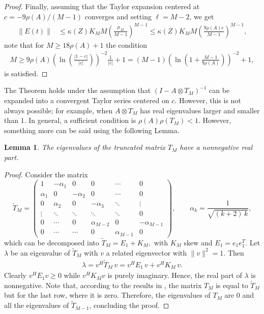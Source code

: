 \documentclass[final,1p,times,number]{elsarticle}
\theoremstyle{plain}%
\newtheorem{lem}[thm]{Lemma}
\begin{document}
\begin{proof}
    Finally, assuming that the Taylor expansion centered at \(c = -9\rho(A)/(M-1)\) converges and setting \(\ell = M-2\), we get
    \begin{align*}
        \| E(t) \| &\leq \kappa(Z)K_M M \left(\frac{\mu_{M}}{M-1} \right)^{M-1} \leq \kappa(Z)K_M M\left(\frac{9 \rho(A) e}{M-1} \right)^{M-1} , 
    \end{align*}
    note that for \(M \geq 18 \rho(A)+1\) the condition
    \begin{align*}
         M  \geq 
         9\rho(A) \left(\ln\left(\frac{|1-c|}{|c|}\right)\right)^{-2}\frac{1}{|c|} +1 = (M-1)\left(\ln\left(1 + \frac{M-1}{9 \rho(A)}\right)\right)^{-2}+1,
    \end{align*}
    is satisfied.
\end{proof}

The Theorem holds under the 
assumption that \((I-A\otimes T_{M})^{-1}\) can be expanded into a convergent Taylor series centered on $c$. However, this is not always possible; for example, when \(A\otimes T_{M}\) has real eigenvalues larger and smaller than $1$. In general, a sufficient condition is \(\rho(A)\rho(T_M) <1\). However, something more can be said using the following Lemma.  

\begin{lem}
    The eigenvalues of the truncated matrix $T_M$ have a nonnegative real part.
\end{lem}
\begin{proof}
  Consider the matrix
    \[ \tilde{T}_M = \begin{pmatrix}
1 & -\alpha_1 & 0 & 0 & \cdots & 0 \\
\alpha_1 & 0 & -\alpha_2 & 0 & \cdots & 0 \\
0 & \alpha_2 & 0 & -\alpha_3 & \ddots & \vdots \\
\vdots & \ddots & \ddots & \ddots & \ddots & 0 \\
0 & \cdots & 0 & \alpha_{M-2} & 0 & -\alpha_{M-1} \\
0 & \cdots & \cdots & 0 & \alpha_{M-1} & 0
\end{pmatrix},
\qquad
\alpha_k = \frac{1}{\sqrt{(k+2)\,k}},\]
which can be decomposed into
\( \tilde{T}_M = E_1 + K_M,\)
with $K_M$ skew and $E_1=e_1 e_1^T$. 
Let $\lambda$ be an eigenvalue of $\tilde{T}_M$ with $v$ a related eigenvector with \(\|v\|^2 = 1\). Then
\begin{align*}
    \lambda  = v^H \tilde{T}_M \, v  = v^H E_1 \,v + v^H K_M \, v.
\end{align*}
Clearly $v^H E_1 v \geq 0$ while $v^H K_M v$ is purely imaginary. Hence, the real part of $\lambda$ is nonnegative.
Note that, according to the results in \cite{pozza2023newk}, the matrix $T_M$ is equal to $\tilde{T}_M$ but for the last row, where it is zero. 
Therefore, the eigenvalues of $T_M$ are $0$ and all the eigenvalues of $\tilde{T}_{M-1}$, concluding the proof.
\end{proof}
\end{document}
